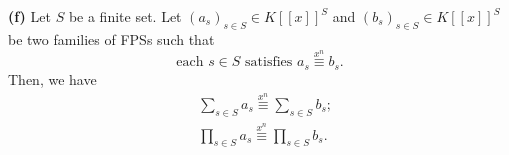 \begin{theorem}
\textbf{(f)} Let $S$ be a finite set. Let $\left(  a_{s}\right)  _{s\in S}\in
K\left[  \left[  x\right]  \right]  ^{S}$ and $\left(  b_{s}\right)  _{s\in
S}\in K\left[  \left[  x\right]  \right]  ^{S}$ be two families of FPSs such
that
\begin{equation}
\text{each }s\in S\text{ satisfies }a_{s}\overset{x^{n}}{\equiv}b_{s}.
\label{eq.thm.fps.xneq.props.e.ass}%
\end{equation}
Then, we have%
\begin{align}
&  \sum_{s\in S}a_{s}\overset{x^{n}}{\equiv}\sum_{s\in S}b_{s}%
;\label{eq.thm.fps.xneq.props.e.+}\\
&  \prod_{s\in S}a_{s}\overset{x^{n}}{\equiv}\prod_{s\in S}b_{s}.
\label{eq.thm.fps.xneq.props.e.*}%
\end{align}

\end{theorem}


